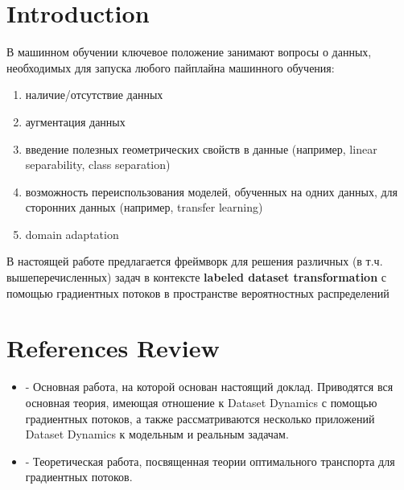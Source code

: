 
\newcommand{\ini}{\text{init}}
\newcommand{\targ}{\text{targ}}
\newcommand{\otdd}{\text{OTDD}}

\newcommand{\bbW}{\mathbb{W}}

\newcommand{\cZ}{\mathcal{Z}}

\newcommand{\olive}[1]{{\color{molive} #1}}

\newcommand{\pink}[1]{{\color{mpink} #1}}

\newcommand{\fiol}[1]{{\color{myfiol} #1}}

\newcommand{\fdv}[2]{\frac{\delta #1}{\delta #2}}
\newcommand{\divg}[1]{\mathbf{\nabla} \cdot #1}

\newcommand{\dd}{\text{d}}

\newtheorem{Obj}{Objective}

\section{Introduction}

В машинном обучении ключевое положение занимают вопросы о данных, необходимых для запуска любого пайплайна машинного обучения: 
\begin{enumerate}
    \item наличие/отсутствие данных
    \item аугментация данных
    \item введение полезных геометрических свойств в данные (например, linear separability, class separation)
    \item возможность переиспользования моделей, обученных на одних данных, для сторонних данных (например, transfer learning)
    \item domain adaptation
\end{enumerate}
В настоящей работе предлагается фреймворк для решения различных (в т.ч. вышеперечисленных) задач в контексте \textbf{labeled dataset transformation} с помощью градиентных потоков в пространстве вероятностных распределений

\section{References Review}
\begin{itemize}
    \item \cite{pmlr-v139-alvarez-melis21a} - Основная работа, на которой основан настоящий доклад. Приводятся вся основная теория, имеющая отношение к Dataset Dynamics с помощью градиентных потоков, а также рассматриваются несколько приложений Dataset Dynamics к модельным и реальным задачам.
    \item \cite{Santambrogio2015OptimalTF} - Теоретическая работа, посвященная теории оптимального транспорта для градиентных потоков.
\end{itemize}

